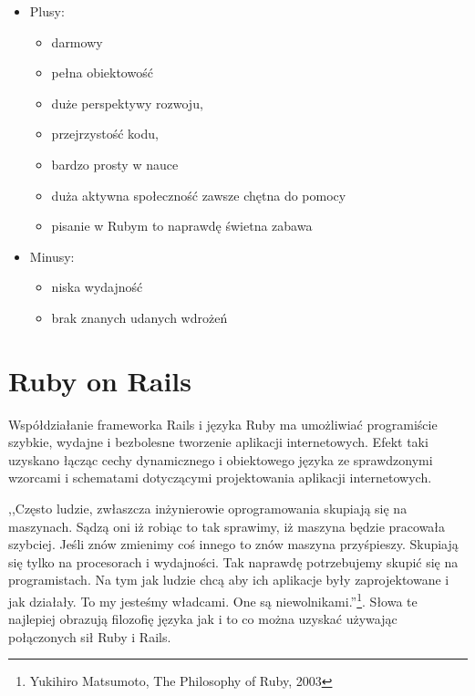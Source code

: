 \documentclass[a4paper,12pt,oneside]{report}
\begin{document}
\begin{itemize}
\item Plusy:
  \begin{itemize}
  \item darmowy
  \item pełna obiektowość
  \item duże perspektywy rozwoju, 
  \item przejrzystość kodu, 
  \item bardzo prosty w nauce
  \item duża aktywna społeczność zawsze chętna do pomocy 
  \item pisanie w Rubym to naprawdę świetna zabawa
  \end{itemize}
\item Minusy:
  \begin{itemize}
  \item niska wydajność
  \item brak znanych udanych wdrożeń
  \end{itemize}
\end{itemize}

\section{Ruby on Rails}
\label{sec:ror}

Współdziałanie frameworka Rails i języka Ruby ma umożliwiać programiście szybkie, wydajne i bezbolesne tworzenie aplikacji internetowych. Efekt taki uzyskano łącząc cechy dynamicznego i obiektowego języka ze sprawdzonymi wzorcami i schematami dotyczącymi projektowania aplikacji internetowych.

,,Często ludzie, zwłaszcza inżynierowie oprogramowania skupiają się na maszynach. Sądzą oni iż robiąc to tak sprawimy, iż maszyna będzie pracowała szybciej. Jeśli znów zmienimy coś innego to znów maszyna przyśpieszy. Skupiają się tylko na procesorach i wydajności. Tak naprawdę potrzebujemy skupić się na programistach. Na tym jak ludzie chcą aby ich aplikacje były zaprojektowane i jak działały. To my jesteśmy władcami. One są niewolnikami.”\footnote{Yukihiro Matsumoto, The Philosophy of Ruby, 2003}. Słowa te najlepiej obrazują filozofię języka jak i to co można uzyskać używając połączonych sił Ruby i Rails. 
\end{document}

